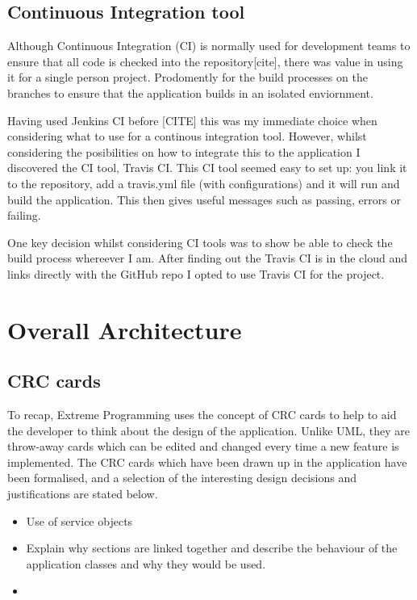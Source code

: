 \subsection{Continuous Integration tool}
Although Continuous Integration (CI) is normally used for development teams to ensure that all code is checked into the repository[cite], there was value in using it for a single person project. Prodomently for the build processes on the branches to ensure that the application builds in an isolated enviornment.

Having used Jenkins CI before [CITE] this was my immediate choice when considering what to use for a continous integration tool. However, whilst considering the posibilities on how to integrate this to the application I discovered the CI tool, Travis CI. This CI tool seemed easy to set up: you link it to the repository, add a travis.yml file (with configurations) and it will run and build the application. This then gives useful messages such as passing, errors or failing.

One key decision whilst considering CI tools was to show be able to check the build process whereever I am. After finding out the Travis CI is in the cloud and links directly with the GitHub repo I opted to use Travis CI for the project.


\section{Overall Architecture}

\subsection{CRC cards}
To recap, Extreme Programming uses the concept of CRC cards to help to aid the developer to think about the design of the application. Unlike UML, they are throw-away cards which can be edited and changed every time a new feature is implemented.  The CRC cards which have been drawn up in the application have been formalised, and a selection of the interesting design decisions and justifications are stated below.

\begin{itemize}
  \item Use of service objects
  \item Explain why sections are linked together and describe the behaviour of the application classes and why they would be used.
  \item
\end{itemize}



